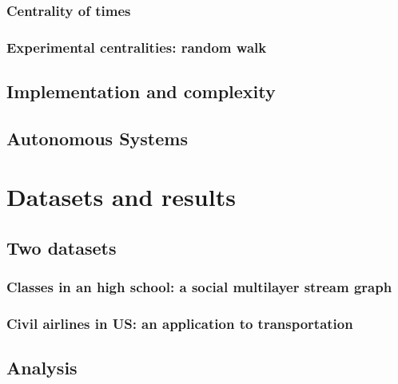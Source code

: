 \documentclass{svproc}
\begin{document}
\subsubsection{Centrality of times}
%

\subsubsection{Experimental centralities: random walk}
%

\subsection{Implementation and complexity}
%
\subsection{Autonomous Systems}
%

\section{Datasets and results}
%
\subsection{Two datasets}
%
\subsubsection{Classes in an high school: a social multilayer stream graph}
%
\subsubsection{Civil airlines in US: an application to transportation}
%
\subsection{Analysis}
%
\end{document}
